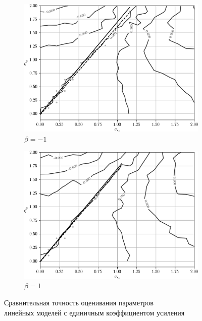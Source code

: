 \begin{figure}[p]
  \begin{subfigure}[b]{\linewidth}
    \centering
    \includegraphics[width=135mm]{fig/linear/param/beta--1_param-accs-approx}
    \caption{\( \beta = -1 \)}\label{fig:comparison_linear_params_beta--1}
  \end{subfigure}

  \vspace{2\baselineskip}
  \begin{subfigure}[b]{\linewidth}
    \centering
    \includegraphics[width=135mm]{fig/linear/param/beta-1_param-accs-approx}
    \caption{\( \beta = 1 \)}\label{fig:comparison_linear_params_beta-1}
  \end{subfigure}

  \vspace{\baselineskip}
  \caption{%
    Сравнительная точность оценивания параметров \\
    линейных моделей с единичным коэффициентом усиления
  }\label{fig:comparison_linear_params_beta-one}
\end{figure}

